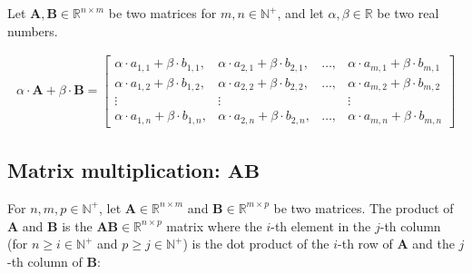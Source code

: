 \documentclass[titlepage]{article}
\begin{document}
        Let $\mathbf{A}, \mathbf{B} \in \mathbb{R}^{n \times m}$ be two matrices
        for $m, n \in \mathbb{N}^+$, and let $\alpha, \beta \in \mathbb{R}$ be
        two real numbers.

        \begin{align*}
          \alpha \cdot \mathbf{A} + \beta \cdot \mathbf{B}
            = \begin{bmatrix}
                \alpha \cdot a_{1,1} + \beta \cdot b_{1,1},
                  & \alpha \cdot a_{2,1} + \beta \cdot b_{2,1},
                  & \ldots,
                  & \alpha \cdot a_{m,1} + \beta \cdot b_{m,1} \\
                \alpha \cdot a_{1,2} + \beta \cdot b_{1,2},
                  & \alpha \cdot a_{2,2} + \beta \cdot b_{2,2},
                  & \ldots,
                  & \alpha \cdot a_{m,2} + \beta \cdot b_{m,2} \\
                \vdots & \vdots & & \vdots \\
                \alpha \cdot a_{1,n} + \beta \cdot b_{1,n},
                  & \alpha \cdot a_{2,n} + \beta \cdot b_{2,n},
                  & \ldots,
                  & \alpha \cdot a_{m,n} + \beta \cdot b_{m,n}
              \end{bmatrix}
        \end{align*}

      \subsection{Matrix multiplication: $\mathbf{AB}$}

        For $n, m, p \in \mathbb{N}^+$, let
        $\mathbf{A} \in \mathbb{R}^{n \times m}$ and
        $\mathbf{B} \in \mathbb{R}^{m \times p}$ be two matrices.
        The product of $\mathbf{A}$ and $\mathbf{B}$ is the
        $\mathbf{AB} \in \mathbb{R}^{n \times p}$ matrix where the $i$-th
        element in the $j$-th column (for $n \geq i \in \mathbb{N}^+$ and
        $p \geq j \in \mathbb{N}^+$) is the dot product of the $i$-th row
        of $\mathbf{A}$ and the $j$-th column of $\mathbf{B}$:
\end{document}
